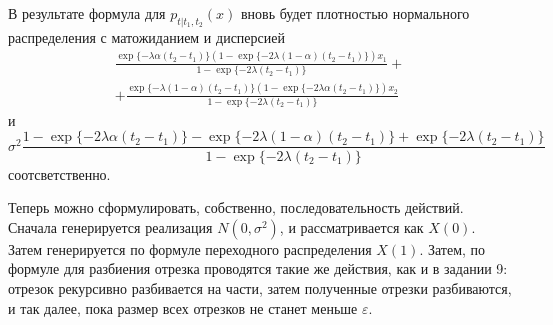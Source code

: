 \documentclass[12pt, a4paper]{article}
\begin{document}
В результате формула для $p_{t\left|t_1,t_2\right. }\left( x\right)$ вновь будет плотностью нормального распределения с матожиданием и дисперсией
\begin{align*}
	\frac{\exp\{-\lambda\alpha(t_2-t_1)\} \left(1-\exp\{-2\lambda(1-\alpha)(t_2-t_1) \}\right)x_1}{1-\exp\{-2\lambda(t_2-t_1)\}} + \\ + \frac{\exp\{-\lambda(1-\alpha)(t_2-t_1)\} \left(1-\exp\{-2\lambda\alpha(t_2-t_1) \}\right)x_2}{1-\exp\{-2\lambda(t_2-t_1)\}}
\end{align*}
и
\[
\sigma^2\frac{1 - \exp\{-2\lambda\alpha(t_2-t_1) \}-\exp\{-2\lambda(1-\alpha)(t_2-t_1) \}+\exp\{-2\lambda(t_2-t_1) \}}
{1-\exp\{-2\lambda(t_2-t_1)\}}
\]
соотсветственно.

Теперь можно сформулировать, собственно, последовательность действий. Сначала генерируется реализация $N(0,\sigma^2)$, и рассматривается как $X(0)$. Затем генерируется по формуле переходного распределения $X(1)$. Затем, по формуле для разбиения отрезка проводятся такие же действия, как и в задании 9: отрезок рекурсивно разбивается на части, затем полученные отрезки разбиваются, и так далее, пока размер всех отрезков не станет меньше $\varepsilon$.
\newpage
\end{document}
